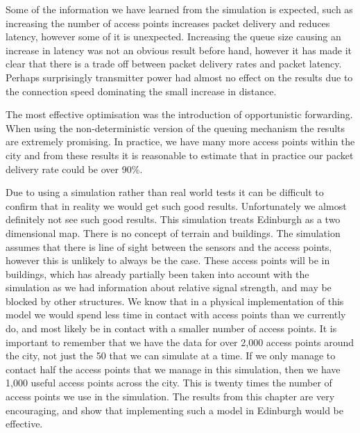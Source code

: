         Some of the information we have learned from the simulation is expected, such as increasing the number of access points increases packet delivery and reduces latency, however some of it is unexpected. Increasing the queue size causing an increase in latency was not an obvious result before hand, however it has made it clear that there is a trade off between packet delivery rates and packet latency. Perhaps surprisingly transmitter power had almost no effect on the results due to the connection speed dominating the small increase in distance. 

        The most effective optimisation was the introduction of opportunistic forwarding. When using the non-deterministic version of the queuing mechanism the results are extremely promising. In practice, we have many more access points within the city and from these results it is reasonable to estimate that in practice our packet delivery rate could be over 90\%. 

        Due to using a simulation rather than real world tests it can be difficult to confirm that in reality we would get such good results. Unfortunately we almost definitely not see such good results. This simulation treats Edinburgh as a two dimensional map. There is no concept of terrain and buildings. The simulation assumes that there is line of sight between the sensors and the access points, however this is unlikely to always be the case. These access points will be in buildings, which has already partially been taken into account with the simulation as we had information about relative signal strength, and may be blocked by other structures. We know that in a physical implementation of this model we would spend less time in contact with access points than we currently do, and most likely be in contact with a smaller number of access points. It is important to remember that we have the data for over 2,000 access points around the city, not just the 50 that we can simulate at a time. If we only manage to contact half the access points that we manage in this simulation, then we have 1,000 useful access points across the city. This is twenty times the number of access points we use in the simulation. The results from this chapter are very encouraging, and show that implementing such a model in Edinburgh would be effective. 
        
